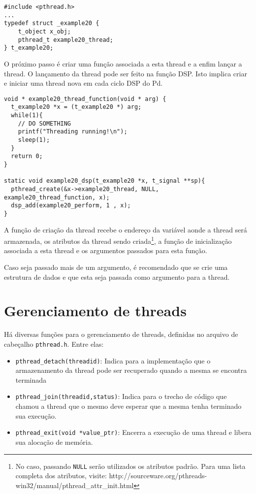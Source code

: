 \begin{lstlisting}
#include <pthread.h>
...
typedef struct _example20 {
    t_object x_obj;
    pthread_t example20_thread;
} t_example20;

\end{lstlisting}

O próximo passo é criar uma função associada a esta thread e a enfim lançar a
thread. O lançamento da thread pode ser feito na função DSP. Isto implica
criar e iniciar uma thread nova em cada ciclo DSP do Pd.

\begin{lstlisting}
void * example20_thread_function(void * arg) {
  t_example20 *x = (t_example20 *) arg;
  while(1){
    // DO SOMETHING
    printf("Threading running!\n");
    sleep(1);
  }
  return 0;
}

static void example20_dsp(t_example20 *x, t_signal **sp){
  pthread_create(&x->example20_thread, NULL, example20_thread_function, x);
  dsp_add(example20_perform, 1 , x);
}
\end{lstlisting}

A função de criação da thread recebe o endereço da variável aonde a thread
será armazenada, os atributos da thread sendo criada\footnote{No caso,
passando \texttt{NULL} serão utilizados os atributos padrão. Para uma lista
completa dos atributos, visite:
http://sourceware.org/pthreads-win32/manual/pthread\_attr\_init.html}, a
função de inicialização associada a esta thread e os argumentos passados para
esta função. 

Caso seja passado mais de um argumento, é recomendado que se crie uma
estrutura de dados e que esta seja passada como argumento para a thread.

\section{Gerenciamento de threads}

Há diversas funções para o gerenciamento de threads, definidas no arquivo de
cabeçalho \texttt{pthread.h}. Entre elas:

\begin{itemize}
\item \texttt{pthread\_detach(threadid)}: Indica para a implementação que o
armazenamento da thread pode ser recuperado quando a mesma se encontra
terminada
\item \texttt{pthread\_join(threadid,status)}: Indica para o trecho de código
que chamou a thread que o mesmo deve esperar que a mesma tenha terminado sua
execução.
\item \texttt{pthread\_exit(void *value\_ptr)}: Encerra a execução de uma
thread e libera sua alocação de memória.
\end{itemize}

